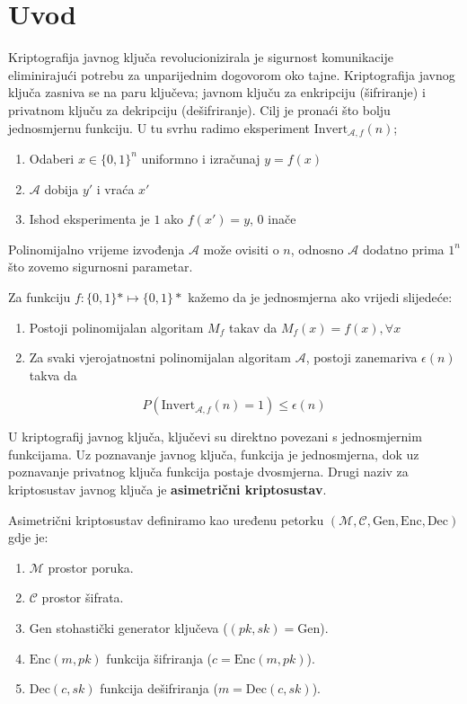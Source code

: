 \documentclass{mathos}
\begin{document}
\section{Uvod}
Kriptografija javnog ključa revolucionizirala je sigurnost komunikacije eliminirajući potrebu za unparijednim dogovorom oko tajne. Kriptografija javnog ključa zasniva se na paru ključeva; javnom ključu za enkripciju (šifriranje) i privatnom ključu za dekripciju (dešifriranje). Cilj je pronaći što bolju jednosmjernu funkciju. U tu svrhu radimo eksperiment $\text{Invert}_{\mathcal{A}, f}(n)$;
\begin{enumerate}
    \item Odaberi $x\in\{0, 1\}^n$ uniformno i izračunaj $y = f(x)$
    \item $\mathcal{A}$ dobija $y'$ i vraća $x'$
    \item Ishod eksperimenta je $1$ ako $f(x') = y$, $0$ inače
\end{enumerate}
\begin{nap}
    Polinomijalno vrijeme izvođenja $\mathcal{A}$ može ovisiti o $n$, odnosno $\mathcal{A}$ dodatno prima $1^n$ što zovemo sigurnosni parametar.
\end{nap}

\begin{defin}
    Za funkciju $f: \{0, 1\}* \mapsto \{0, 1\}*$ kažemo da je jednosmjerna ako vrijedi slijedeće:
    \begin{enumerate}
        \item Postoji polinomijalan algoritam $M_f$ takav da $M_f(x) = f(x), \forall x$
        \item Za svaki vjerojatnostni polinomijalan algoritam $\mathcal{A}$, postoji zanemariva $\epsilon(n)$ takva da
    \end{enumerate}
    \[ P(\text{Invert}_{\mathcal{A}, f}(n) = 1) \leq \epsilon(n) \]
\end{defin} 

U kriptografij javnog ključa, ključevi su direktno povezani s jednosmjernim funkcijama. Uz poznavanje javnog ključa, funkcija je jednosmjerna, dok uz poznavanje privatnog ključa funkcija postaje dvosmjerna. Drugi naziv za kriptosustav javnog ključa je \textbf{asimetrični kriptosustav}.

\begin{defin}
Asimetrični kriptosustav definiramo kao uređenu petorku $(\mathcal{M}, \mathcal{C}, \text{Gen}, \text{Enc}, \text{Dec})$ gdje je:
\begin{enumerate}
    \item $\mathcal{M}$ prostor poruka.
    \item $\mathcal{C}$ prostor šifrata.
    \item $\text{Gen}$ stohastički generator ključeva ($(pk, sk) = \text{Gen}$).
    \item $\text{Enc}(m, pk)$ funkcija šifriranja ($c =\text{Enc}(m, pk)$).
    \item $\text{Dec}(c, sk)$ funkcija dešifriranja ($m = \text{Dec}(c, sk)$).
\end{enumerate}
\end{defin}
\end{document}
